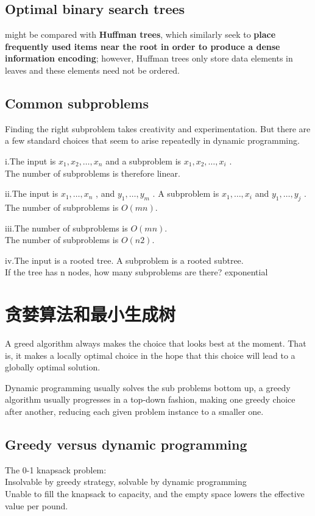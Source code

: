 \documentclass{article}
\begin{document}
\subsection{Optimal binary search trees}
might be compared with \textbf{Huffman trees}, which similarly seek to \textbf{place frequently used items near the root in order to produce a dense information encoding}; however, Huffman trees only store data elements in leaves and these elements need not be ordered.

\subsection{Common subproblems}
Finding the right subproblem takes creativity and experimentation. But there are a few standard choices that seem to arise repeatedly in dynamic programming.

i.The input is $x_1 ,x_2 ,\ldots ,x_n$ and a subproblem is $x_1,x_2,\ldots,x_i$ .\\
The number of subproblems is therefore linear.

ii.The input is $x_1,\ldots,x_n$ , and $y_1 ,\ldots ,y_m$ . A subproblem is $x_1 ,\ldots ,x_i$ and $y_1 ,\ldots ,y_j$ .\\
The number of subproblems is $O(mn)$.

iii.The number of subproblems is $O(mn)$.\\
The number of subproblems is $O(n2)$.

iv.The input is a rooted tree. A subproblem is a rooted subtree.\\
If the tree has n nodes, how many subproblems are there? exponential

\section{贪婪算法和最小生成树}
A greed algorithm always makes the choice that looks best at the moment. That is, it makes a locally optimal choice in the hope that this choice will lead to a globally optimal solution.

Dynamic programming usually solves the sub problems bottom up, a greedy algorithm usually progresses in a top-down fashion, making one greedy choice after another, reducing each given problem instance to a smaller one.

\subsection{Greedy versus dynamic programming}
The 0-1 knapsack problem:\\
Insolvable by greedy strategy, solvable by dynamic programming\\
Unable to fill the knapsack to capacity, and the empty space lowers the effective value per pound.
\end{document}
